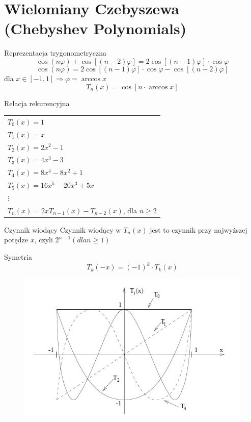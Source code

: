 \section{Wielomiany Czebyszewa (Chebyshev Polynomials)}
\begin{frame}{Reprezentacja trygonometryczna}
	$$\cos(n\varphi)+\cos[(n-2)\varphi] = 2\cos[(n-1)\varphi] \cdot \cos \varphi$$
    $$\cos(n\varphi) = 2\cos[(n-1)\varphi] \cdot \cos \varphi - \cos[(n-2)\varphi]$$
    dla $x \in [-1,1]\Rightarrow \varphi=\arccos x$
    $$T_n(x) = \cos[n \cdot \arccos x]$$
\end{frame}
\begin{frame}{Relacja rekurencyjna}
	\begin{tabular}{l}
		$T_0(x) = 1$ \\
        $T_1(x) = x$ \\
        $T_2(x) = 2x^2-1$ \\
        $T_3(x) = 4x^3-3$ \\
        $T_4(x) = 8x^4-8x^2+1$ \\
        $T_5(x) = 16x^5-20x^3+5x$ \\
        $\vdots$ \\
        $T_n(x) = 2xT_{n-1}(x) - T_{n-2}(x)$, dla $n\geqslant2$
	\end{tabular}
    
    \begin{block}{Czynnik wiodący}
    	Czynnik wiodący w $T_n(x)$ jest to czynnik przy najwyższej potędze $x$, czyli $2^{n-1} (dla n\geqslant1)$
    \end{block}
\end{frame}
\begin{frame}{Symetria}
	$$T_k(-x)=(-1)^k \cdot T_k(x)$$
    \begin{figure}
		\includegraphics[height=0.75\textheight]{img/5/symetria.jpg}
	\end{figure}
\end{frame}
